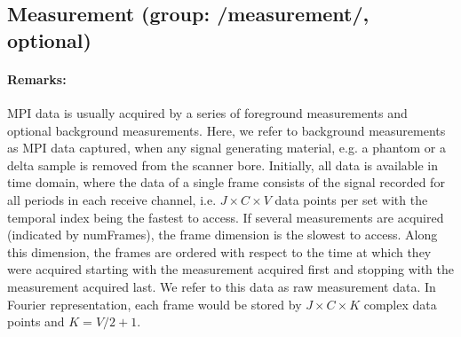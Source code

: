 \documentclass[landscape,a4paper]{article} %
\newcommand{\inlvar}[1]{{\ttfamily#1}}
\begin{document}
\subsection{Measurement (group: \inlvar{/measurement/}, optional)}
\begin{multicols}{2}

\paragraph{Remarks:}
MPI data is usually acquired by a series of foreground measurements and optional background measurements. Here, we refer to background measurements as MPI data captured, when any signal generating material, e.g. a phantom or a delta sample is removed from the scanner bore. Initially, all data is available in time domain, where the data of a single frame consists of the signal recorded for all periods in each receive channel, i.e. $J \times C \times V$ data points per set with the temporal index being the fastest to access.  If several measurements are acquired (indicated by \inlvar{numFrames}), the frame dimension is the slowest to access. Along this dimension, the frames are ordered with respect to the time at which they were acquired starting with the measurement acquired first and stopping with the measurement acquired last. We refer to this data as raw measurement data. In Fourier representation, each frame would be stored by $J \times C\times K$ complex data points and $K = V/2 +1$.


\end{multicols}
\end{document}
